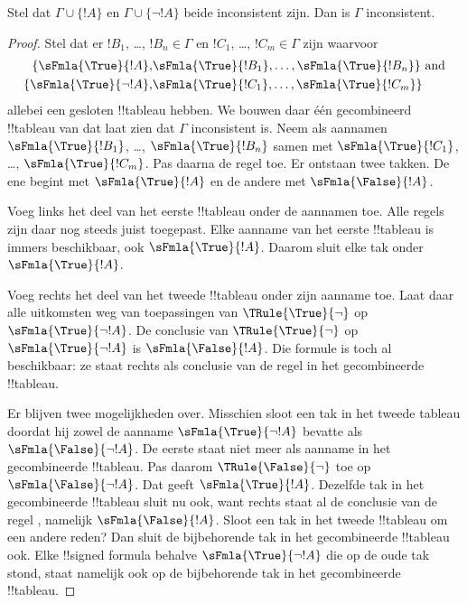 \documentclass[openany]{memoir}
\begin{document}
\begin{prop}
  Stel dat $\Gamma \cup \{!A\}$ en $\Gamma \cup \{\lnot !A\}$ beide
  inconsistent zijn. Dan is $\Gamma$ inconsistent.
\end{prop}

\begin{proof}
  Stel dat er $!B_1$, \dots, $!B_n \in \Gamma$ en $!C_1$, \dots,
  $!C_m \in \Gamma$ zijn waarvoor
  \begin{align*}
    \{\sFmla{\True}{!A}, &
    \sFmla{\True}{!B_1}, \dots, \sFmla{\True}{!B_n}\} \text{ and}\\
    \{\sFmla{\True}{\lnot !A}, &
    \sFmla{\True}{!C_1}, \dots, \sFmla{\True}{!C_m}\}
  \end{align*}
  allebei een gesloten !!{tableau} hebben. We bouwen daar één
  gecombineerd !!{tableau} van dat laat zien dat $\Gamma$ inconsistent
  is. Neem als aannamen
  $\sFmla{\True}{!B_1}$, \dots, $\sFmla{\True}{!B_n}$ samen met
  $\sFmla{\True}{!C_1}$, \dots, $\sFmla{\True}{!C_m}$. Pas daarna de
  regel \Cut{} toe. Er ontstaan twee takken. De ene begint met
  $\sFmla{\True}{!A}$ en de andere met $\sFmla{\False}{!A}$.  
  
  Voeg links het deel van het eerste !!{tableau} onder de aannamen
  toe. Alle regels zijn daar nog steeds juist toegepast. Elke aanname
  van het eerste !!{tableau} is immers beschikbaar, ook
  $\sFmla{\True}{!A}$. Daarom sluit elke tak onder
  $\sFmla{\True}{!A}$. 
  
  Voeg rechts het deel van het tweede !!{tableau} onder zijn aanname
  toe. Laat daar alle uitkomsten weg van toepassingen van
  $\TRule{\True}{\lnot}$ op $\sFmla{\True}{\lnot !A}$. De conclusie
  van $\TRule{\True}{\lnot}$ op $\sFmla{\True}{\lnot !A}$ is
  $\sFmla{\False}{!A}$. Die formule is toch al beschikbaar: ze staat
  rechts als conclusie van de regel \Cut{} in het gecombineerde
  !!{tableau}.

  Er blijven twee mogelijkheden over. Misschien sloot een tak in het
  tweede tableau doordat hij zowel de aanname
  $\sFmla{\True}{\lnot !A}$ bevatte als
  $\sFmla{\False}{\lnot !A}$. De eerste staat niet meer als aanname in
  het gecombineerde !!{tableau}. Pas daarom
  $\TRule{\False}{\lnot}$ toe op $\sFmla{\False}{\lnot !A}$. Dat geeft
  $\sFmla{\True}{!A}$. Dezelfde tak in het gecombineerde !!{tableau}
  sluit nu ook, want rechts staat al de conclusie van de regel \Cut{},
  namelijk $\sFmla{\False}{!A}$. Sloot een tak in het tweede
  !!{tableau} om een andere reden? Dan sluit de bijbehorende tak in het
  gecombineerde !!{tableau} ook. Elke !!{signed formula} behalve
  $\sFmla{\True}{\lnot !A}$ die op de oude tak stond, staat namelijk
  ook op de bijbehorende tak in het gecombineerde !!{tableau}.
  \end{proof}
\endgroup
\end{document}
